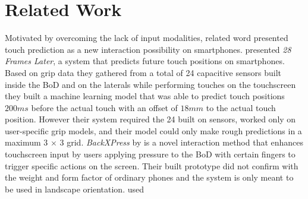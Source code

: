 \section{Related Work}
\label{sec:relw}
Motivated by overcoming the lack of input modalities, related word presented touch prediction as a new interaction possibility on smartphones.
\citeauthor{MohdNoor2016} \cite{MohdNoor2016} presented \textit{28 Frames Later}, a system that predicts future touch positions on smartphones. 
Based on grip data they gathered from a total of 24 capacitive sensors built inside the BoD and on the laterals while performing touches on the touchscreen they built a machine learning model that was able to predict touch positions $ 200ms $ before the actual touch with an offset of $ 18mm $ to the actual touch position.
However their system required the 24 built on sensors, worked only on user-specific grip models, and their model could only make rough predictions in a maximum 3 $\times$ 3 grid.
\textit{BackXPress} by \citeauthor{Corsten2017} \cite{Corsten2017} is a novel interaction method that enhances touchscreen input by users applying pressure to the BoD with certain fingers to trigger specific actions on the screen.
Their built prototype did not confirm with the weight and form factor of ordinary phones and the system is only meant to be used in landscape orientation.
\citeauthor{Lochtefeld2015} \cite{Lochtefeld2015} used 


